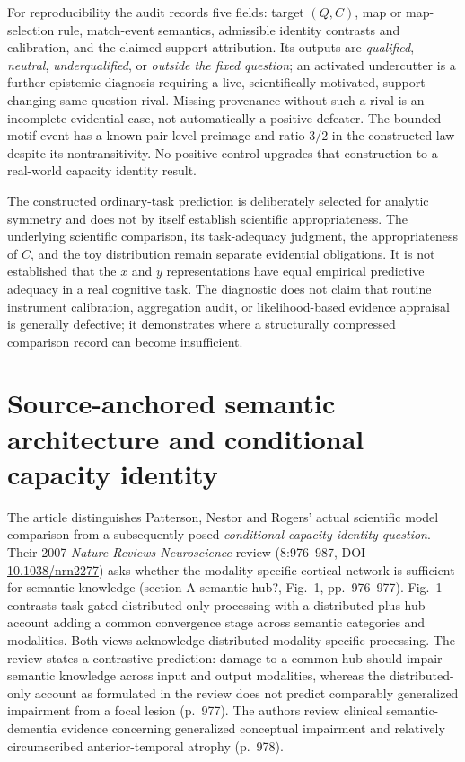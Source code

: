 \documentclass[11pt]{article}
\begin{document}
For reproducibility the audit records five fields: target \((Q,C)\), map or map-selection rule, match-event semantics, admissible identity contrasts and calibration, and the claimed support attribution. Its outputs are \emph{qualified}, \emph{neutral}, \emph{underqualified}, or \emph{outside the fixed question}; an activated undercutter is a further epistemic diagnosis requiring a live, scientifically motivated, support-changing same-question rival. Missing provenance without such a rival is an incomplete evidential case, not automatically a positive defeater. The bounded-motif event has a known pair-level preimage and ratio \(3/2\) in the constructed law despite its nontransitivity. No positive control upgrades that construction to a real-world capacity identity result.

The constructed ordinary-task prediction is deliberately selected for analytic symmetry and does not by itself establish scientific appropriateness. The underlying scientific comparison, its task-adequacy judgment, the appropriateness of \(C\), and the toy distribution remain separate evidential obligations. It is not established that the \(x\) and \(y\) representations have equal empirical predictive adequacy in a real cognitive task. The diagnostic does not claim that routine instrument calibration, aggregation audit, or likelihood-based evidence appraisal is generally defective; it demonstrates where a structurally compressed comparison record can become insufficient.


\section{Source-anchored semantic architecture and conditional capacity identity}

The article distinguishes Patterson, Nestor and Rogers' actual scientific model comparison from a subsequently posed \emph{conditional capacity-identity question}. Their 2007 \emph{Nature Reviews Neuroscience} review (8:976--987, DOI \href{https://doi.org/10.1038/nrn2277}{10.1038/nrn2277}) asks whether the modality-specific cortical network is sufficient for semantic knowledge (section A semantic hub?, Fig.~1, pp.~976--977). Fig.~1 contrasts task-gated distributed-only processing with a distributed-plus-hub account adding a common convergence stage across semantic categories and modalities. Both views acknowledge distributed modality-specific processing. The review states a contrastive prediction: damage to a common hub should impair semantic knowledge across input and output modalities, whereas the distributed-only account as formulated in the review does not predict comparably generalized impairment from a focal lesion (p.~977). The authors review clinical semantic-dementia evidence concerning generalized conceptual impairment and relatively circumscribed anterior-temporal atrophy (p.~978).
\end{document}

